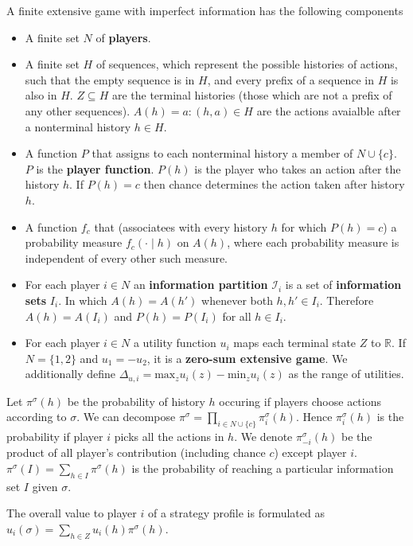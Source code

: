 \documentclass[twocolumn]{article}
\begin{document}
A finite extensive game with imperfect information has the following components
\begin{itemize}
    \item A finite set $N$ of \textbf{players}.
    \item A finite set $H$ of sequences, which represent the possible histories of actions, such that the empty sequence is in $H$, and every prefix of a sequence in $H$ is also in $H$. $Z \subseteq H$ are the terminal histories (those which are not a prefix of any other sequences). $A(h) = {a: (h,a) \in H}$ are the actions avaialble after a nonterminal history $h \in H$.
    \item A function $P$ that assigns to each nonterminal history a member of $N \cup \{ c \} $. $P$ is the \textbf{player function}. $P(h)$ is the player who takes an action after the history $h$. If $P(h) = c$ then chance determines the action taken after history $h$.
    \item A function $f_c$ that (associatees with every history $h$ for which $P(h) = c$) a probability measure $f_c(\cdot \mid h)$ on $A(h)$, where each probability measure is independent of every other such measure.
    \item For each player $i \in N$ an \textbf{information partition} $\mathcal{I}_i$ is a set of \textbf{information sets} $I_i$. In which $A(h) = A(h')$ whenever both $h, h' \in I_i$. Therefore $A(h) = A(I_i)$ and $P(h) = P(I_i)$ for all $h \in I_i$.
    \item For each player $i \in N$ a utility function $u_i$ maps each terminal state $Z$ to $\mathbb{R}$. If $N = \{1,2\}$ and $u_1=-u_2$, it is a \textbf{zero-sum extensive game}. We additionally define $\Delta_{u,i} = \text{max}_z u_i(z) - \text{min}_z u_i(z)$ as the range of utilities.
\end{itemize}

Let $\pi^\sigma(h)$ be the probability of history $h$ occuring if players choose actions according to $\sigma$. We can decompose $\pi^\sigma = \prod_{i \in N \cup \{c \}}\pi^\sigma_i(h)$. Hence $\pi^\sigma_i(h)$ is the probability if player $i$ picks all the actions in $h$. We denote $\pi^\sigma_{-i}(h)$ be the product of all player's contribution (including chance $c$) except player $i$. $\pi^\sigma(I) = \sum_{h \in I}\pi^\sigma(h)$ is the probability of reaching a particular information set $I$ given $\sigma$.

The overall value to player $i$ of a strategy profile is formulated as $u_i(\sigma) = \sum_{h \in Z}{u_i(h)\pi^\sigma (h)}$.
\end{document}
